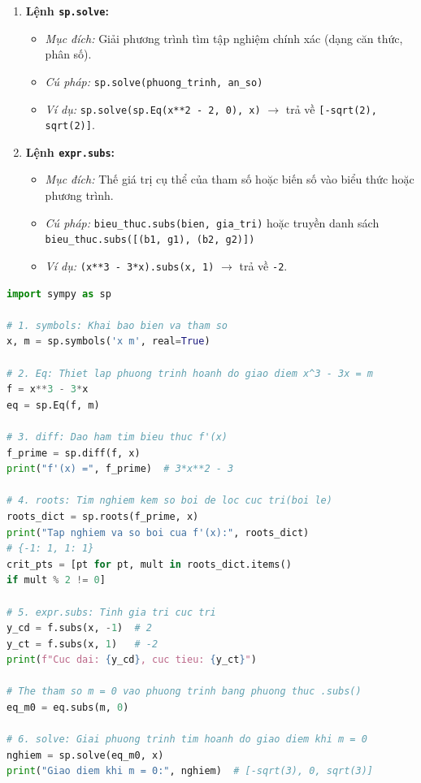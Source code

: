 \begin{enumerate}
    \item \textbf{Lệnh \texttt{sp.solve}:}
    \begin{itemize}
        \item \textit{Mục đích:} Giải phương trình tìm tập nghiệm chính xác (dạng căn thức, phân số).
        \item \textit{Cú pháp:} \texttt{sp.solve(phuong\_trinh, an\_so)}
        \item \textit{Ví dụ:} \texttt{sp.solve(sp.Eq(x**2 - 2, 0), x)} $\rightarrow$ trả về \texttt{[-sqrt(2), sqrt(2)]}.
    \end{itemize}

    \item \textbf{Lệnh \texttt{expr.subs}:}
    \begin{itemize}
        \item \textit{Mục đích:} Thế giá trị cụ thể của tham số hoặc biến số vào biểu thức hoặc phương trình.
        \item \textit{Cú pháp:} \texttt{bieu\_thuc.subs(bien, gia\_tri)} hoặc truyền danh sách \texttt{bieu\_thuc.subs([(b1, g1), (b2, g2)])}
        \item \textit{Ví dụ:} \texttt{(x**3 - 3*x).subs(x, 1)} $\rightarrow$ trả về \texttt{-2}.
    \end{itemize}
\end{enumerate}

\begin{lstlisting}[language=Python, caption={Ví dụ tích hợp 6 lệnh cốt lõi cho bài toán tương giao}]
import sympy as sp

# 1. symbols: Khai bao bien va tham so
x, m = sp.symbols('x m', real=True)

# 2. Eq: Thiet lap phuong trinh hoanh do giao diem x^3 - 3x = m
f = x**3 - 3*x
eq = sp.Eq(f, m)

# 3. diff: Dao ham tim bieu thuc f'(x)
f_prime = sp.diff(f, x)
print("f'(x) =", f_prime)  # 3*x**2 - 3

# 4. roots: Tim nghiem kem so boi de loc cuc tri(boi le)
roots_dict = sp.roots(f_prime, x)
print("Tap nghiem va so boi cua f'(x):", roots_dict)  
# {-1: 1, 1: 1}
crit_pts = [pt for pt, mult in roots_dict.items() 
if mult % 2 != 0]

# 5. expr.subs: Tinh gia tri cuc tri
y_cd = f.subs(x, -1)  # 2
y_ct = f.subs(x, 1)   # -2
print(f"Cuc dai: {y_cd}, cuc tieu: {y_ct}")

# The tham so m = 0 vao phuong trinh bang phuong thuc .subs()
eq_m0 = eq.subs(m, 0)

# 6. solve: Giai phuong trinh tim hoanh do giao diem khi m = 0
nghiem = sp.solve(eq_m0, x)
print("Giao diem khi m = 0:", nghiem)  # [-sqrt(3), 0, sqrt(3)]
\end{lstlisting}

